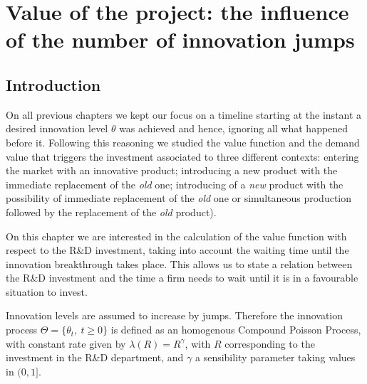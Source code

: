 \chapter{Value of the project: the influence of the number of innovation jumps}
\label{chapter:max}



\section{Introduction}
\label{section:max_intro}

On all previous chapters we kept our focus on a timeline starting at the instant a desired innovation level $\theta$ was achieved and hence, ignoring all what happened before it. Following this reasoning we 
studied the value function and the demand value that triggers the investment associated to three different contexts: entering the market with an innovative product; introducing a new product with the immediate replacement of the \textit{old} one; introducing of a \textit{new} product with the possibility of immediate replacement of the \textit{old} one or simultaneous production followed by the replacement of the \textit{old} product).

On this chapter we are interested
in the calculation of the value function with respect to the R\&D investment, taking into account the waiting time until the innovation breakthrough takes place.
This allows us to state a relation between the R\&D investment and the time a firm needs to wait until it is in a favourable situation to invest.



Innovation levels are assumed to increase by jumps. Therefore the innovation process
$\Theta=\{ \theta_t, \ t \geq 0 \}$ is defined as an homogenous Compound Poisson Process, with constant rate given by $\lambda(R)=R^\gamma$, with $R$ corresponding to the investment in the R\&D department, and $\gamma$ a sensibility parameter taking values in $(0,1]$.


